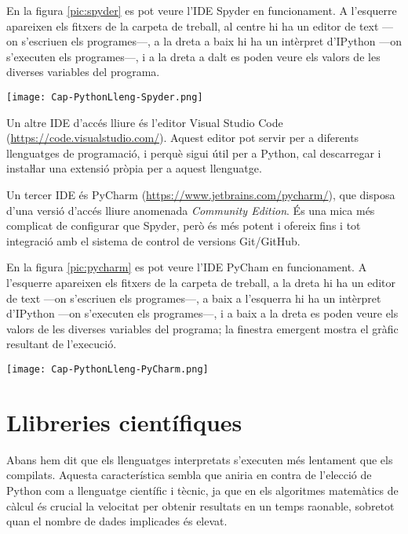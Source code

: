 En la figura \vref{pic:spyder} es pot veure l'IDE Spyder en funcionament. A l'esquerre apareixen els fitxers de la carpeta de treball, al centre hi ha un editor de text ---on s'escriuen els programes---, a la dreta a baix hi ha un intèrpret d'IPython ---on s'executen els programes---, i a la dreta a  dalt es poden veure els valors de les diverses variables del programa.

\begin{center}
	\centering
	\texttt{[image: Cap-PythonLleng-Spyder.png]}
	\label{pic:spyder}
\end{center}

Un altre IDE d'accés lliure és l'editor  Visual Studio Code (\href{https://code.visualstudio.com/}{https:/\!\!/code.visualstudio.com/}). Aquest editor pot servir per a diferents llenguatges de programació, i perquè sigui útil per a Python, cal descarregar i instaŀlar una extensió pròpia per a aquest llenguatge.

Un tercer IDE és PyCharm (\href{https://www.jetbrains.com/pycharm/}{https:/\!\!/www.jetbrains.com/pycharm/}), que disposa d'una versió d'accés lliure anomenada \textit{Community Edition}. És una mica més complicat de configurar que Spyder, però és més potent i ofereix fins i tot integració amb el sistema de control de versions Git/GitHub.

	
En la figura \vref{pic:pycharm} es pot veure l'IDE PyCham en funcionament. A l'esquerre apareixen els fitxers de la carpeta de treball, a la dreta hi ha un editor de text ---on s'escriuen els programes---, a baix a l'esquerra  hi ha un intèrpret d'IPython ---on s'executen els programes---, i a baix a la dreta es poden veure els valors de les diverses variables del programa; la finestra emergent mostra el gràfic resultant de l'execució.

\begin{center}
	\centering
	\texttt{[image: Cap-PythonLleng-PyCharm.png]}
	\label{pic:pycharm}
\end{center}


\section{Llibreries científiques}\label{sec:python-libs}

Abans hem dit que els llenguatges interpretats s'executen més lentament que els compilats. Aquesta característica sembla que aniria en contra de l'elecció de Python com a llenguatge científic i tècnic, ja que en els algoritmes matemàtics de càlcul és crucial la velocitat per obtenir resultats en un temps raonable, sobretot quan el nombre de dades implicades és elevat.

